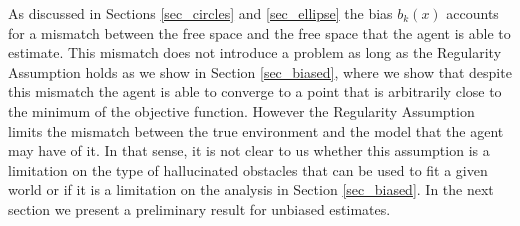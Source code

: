 \documentclass[article]{IEEEtran}
\theoremstyle{definition}
\begin{document}
As discussed in Sections \ref{sec_circles} and \ref{sec_ellipse} the bias $b_k(x)$ accounts for a mismatch between the free space and the free space that the agent is able to estimate. This mismatch does not introduce a problem as long as the Regularity Assumption holds as we show in Section \ref{sec_biased}, where we show that despite this mismatch the agent is able to converge to a point that is arbitrarily close to the minimum of the objective function. However the Regularity Assumption limits the mismatch between the true environment and the model that the agent may have of it. In that sense, it is not clear to us whether this assumption is a limitation on the type of hallucinated obstacles that can be used to fit a given world or if it is a limitation on the analysis in Section \ref{sec_biased}. In the next section we present a preliminary result for unbiased estimates.
\end{document}
